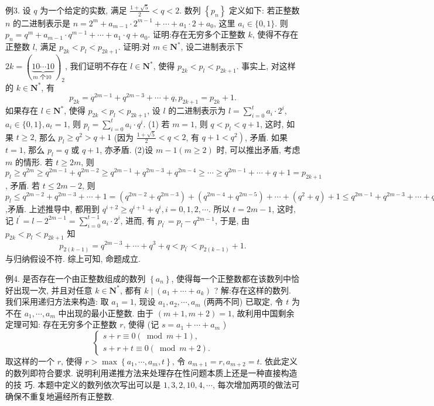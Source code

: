 例3. 设 $q$ 为一个给定的实数, 满足 $\frac{1+\sqrt{5}}{2}<q<2$. 数列 $\left\{p_n\right\}$ 定义如下: 若正整数 $n$ 的二进制表示是 $n=2^m+a_{m-1} \cdot 2^{m-1}+\cdots+a_1 \cdot 2+a_0$, 这里 $a_i \in\{0,1\}$. 则 $p_n=q^m+a_{m-1} \cdot q^{m-1}+\cdots+a_1 \cdot q+a_0$. 证明:存在无穷多个正整数 $k$, 使得不存在正整数 $l$, 满足 $p_{2 k}<p_l<p_{2 k+1}$.
证明:对 $m \in \mathbf{N}^*$, 设二进制表示下 $2 k=(\underbrace{10 \cdots 10}_{m \text { 个10 }})_2$, 我们证明不存在 $l \in \mathbf{N}^*$, 使得 $p_{2 k}<p_l<p_{2 k+1}$.
事实上, 对这样的 $k \in \mathbf{N}^*$, 有
$$
p_{2 k}=q^{2 m-1}+q^{2 m-3}+\cdots+q, p_{2 k+1}=p_{2 k}+1 .
$$
如果存在 $l \in \mathbf{N}^*$, 使得 $p_{2 k}<p_l<p_{2 k+1}$, 设 $l$ 的二进制表示为 $l=\sum_{i=0}^t a_i \cdot 2^i$, $a_i \in\{0,1\}, a_t=1$, 则 $p_l=\sum_{i=0}^t a_i \cdot q^i$.
(1) 若 $m=1$, 则 $q<p_l<q+1$, 这时, 如果 $t \geqslant 2$, 那么 $p_l \geqslant q^2>q+1$ (因为 $\frac{1+\sqrt{5}}{2}<q<2$, 有 $\left.q+1<q^2\right)$, 矛盾.
如果 $t=1$, 那么 $p_l=q$ 或 $q+1$, 亦矛盾.
(2)设 $m-1(m \geqslant 2)$ 时, 可以推出矛盾, 考虑 $m$ 的情形.
若 $t \geqslant 2 m$, 则 $p_l \geqslant q^{2 m} \geqslant q^{2 m-1}+q^{2 m-2} \geqslant q^{2 m-1}+q^{2 m-3}+q^{2 m-4} \geqslant \cdots \geqslant q^{2 m-1}+\cdots+q+1=p_{2 k+1}$, 矛盾.
若 $t \leqslant 2 m-2$, 则 $p_l \leqslant q^{2 m-2}+q^{2 m-3}+\cdots+1=\left(q^{2 m-2}+q^{2 m-3}\right)+ \left(q^{2 m-4}+q^{2 m-5}\right)+\cdots+\left(q^2+q\right)+1 \leqslant q^{2 m-1}+q^{2 m-3}+\cdots+q^3+1<q^{2 m-1}+\cdots+ q^3+q=p_{2 k}$,矛盾.
上述推导中, 都用到 $q^{i+2} \geqslant q^{i+1}+q^i, i=0,1,2, \cdots$.
所以 $t=2 m-1$, 这时, 记 $l^{\prime}=l-2^{2 m-1}=\sum_{i=0}^{t-1} a_i \cdot 2^i$, 进而, 有 $p_{l^{\prime}}=p_l- q^{2 m-1}$, 于是, 由 $p_{2 k}<p_l<p_{2 k+1}$ 知
$$
p_{2(k-1)}=q^{2 m-3}+\cdots+q^3+q<p_{l^{\prime}}<p_{2(k-1)}+1 .
$$
与归纳假设不符.
综上可知, 命题成立.



例4. 是否存在一个由正整数组成的数列 $\left\{a_n\right\}$, 使得每一个正整数都在该数列中恰好出现一次, 并且对任意 $k \in \mathbf{N}^*$, 都有 $k \mid\left(a_1+\cdots+a_k\right)$ ?
解:存在这样的数列.
我们采用递归方法来构造: 取 $a_1=1$, 现设 $a_1, a_2, \cdots, a_m$ (两两不同) 已取定, 令 $t$ 为不在 $a_1, \cdots, a_m$ 中出现的最小正整数.
由于 $(m+1, m+2)=1$, 故利用中国剩余定理可知: 存在无穷多个正整数 $r$, 使得 (记 $s=a_1+\cdots+a_m$ )
$$
\left\{\begin{array}{l}
s+r \equiv 0(\bmod m+1), \\
s+r+t \equiv 0(\bmod m+2) .
\end{array}\right.
$$
取这样的一个 $r$, 使得 $r>\max \left\{a_1, \cdots, a_m, t\right\}$, 令 $a_{m+1}=r, a_{m+2}=t$. 依此定义的数列即符合要求.
说明利用递推方法来处理存在性问题本质上还是一种直接构造的技 巧.
本题中定义的数列依次写出可以是 $1,3,2,10,4, \cdots$, 每次增加两项的做法可确保不重复地遍经所有正整数.



